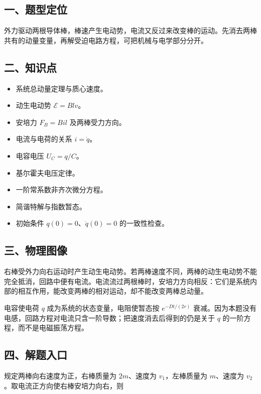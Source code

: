 \documentclass[12pt,a4paper,UTF8]{ctexart}
\newcommand{\tightlist}{\setlength{\itemsep}{0pt}\setlength{\parskip}{0pt}}
\begin{document}
\subsection{一、题型定位}\label{ux4e00ux9898ux578bux5b9aux4f4d-2}

外力驱动两根导体棒，棒速产生电动势，电流又反过来改变棒的运动。先消去两棒共有的动量变量，再解受迫电路方程，可把机械与电学部分分开。

\subsection{二、知识点}\label{ux4e8cux77e5ux8bc6ux70b9-2}

\begin{itemize}
\tightlist
\item
  系统总动量定理与质心速度。
\item
  动生电动势 \(\mathcal E=Blv\)。
\item
  安培力 \(F_B=Bil\) 及两棒受力方向。
\item
  电流与电荷的关系 \(i=\dot q\)。
\item
  电容电压 \(U_C=q/C\)。
\item
  基尔霍夫电压定律。
\item
  一阶常系数非齐次微分方程。
\item
  简谐特解与指数暂态。
\item
  初始条件 \(q(0)=0\)、\(\dot q(0)=0\) 的一致性检查。
\end{itemize}

\subsection{三、物理图像}\label{ux4e09ux7269ux7406ux56feux50cf-2}

右棒受外力向右运动时产生动生电动势。若两棒速度不同，两棒的动生电动势不能完全抵消，回路中便有电流。电流流过两根棒时，安培力方向相反：它们是系统内部的相互作用，能改变两棒的相对运动，却不能改变两棒总动量。

电容使电荷 \(q\) 成为系统的状态变量，电阻使暂态按 \(e^{-Dt/(2r)}\)
衰减。因为本题没有电感，回路方程对电流只含一阶导数；把速度消去后得到的仍是关于
\(q\) 的一阶方程，而不是电磁振荡方程。

\subsection{四、解题入口}\label{ux56dbux89e3ux9898ux5165ux53e3-2}

规定两棒向右速度为正，右棒质量为 \(2m\)、速度为 \(v_1\)，左棒质量为
\(m\)、速度为 \(v_2\)。取电流正方向使右棒安培力向右，则
\end{document}
